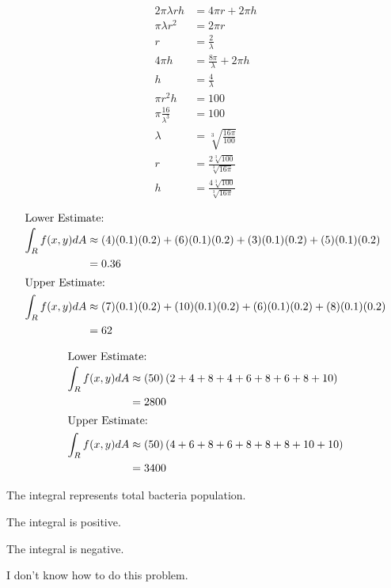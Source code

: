 \documentclass[10pt]{extarticle}
\begin{document}
\begin{problem}{15.3}
\begin{description}[font=\normalfont]
\begin{align*}
          2\pi\lambda r h &= 4\pi r + 2\pi h\\
          \pi\lambda r^2 &= 2\pi r\\
          r &= \frac{2}{\lambda}\\
          4\pi h &= \frac{8\pi}{\lambda} + 2\pi h\\
          h &= \frac{4}{\lambda}\\
          \pi r^2 h &= 100\\
          \pi \frac{16}{\lambda^3} &= 100\\
          \lambda &= \sqrt[3]{\frac{16\pi}{100}}\\
          r &= \frac{2\sqrt[3]{100}}{\sqrt[3]{16\pi}}\\
          h &= \frac{4\sqrt[3]{100}}{\sqrt[3]{16\pi}}
        \end{align*}
    \end{description}
  \end{problem}
  \begin{problem}{16.1}
    \begin{description}[font=\normalfont]
      \item[2:]
        \begin{align*}
          \shortintertext{Lower Estimate:}
          \int_{R}f(x,y) dA &\approx (4)(0.1)(0.2) + (6)(0.1)(0.2) + (3)(0.1)(0.2) + (5)(0.1)(0.2)\\
                            &= 0.36\\
          \shortintertext{Upper Estimate:}
          \int_{R}f(x,y) dA &\approx (7)(0.1)(0.2) + (10)(0.1)(0.2) + (6)(0.1)(0.2) + (8)(0.1)(0.2)\\
                            &= 62
        \end{align*}
      \item[4:]
        \begin{align*}
          \shortintertext{Lower Estimate:}
          \int_{R}f(x,y) dA &\approx (50)\left(2+4+8+4+6+8+6+8+10\right)\\
                            &= 2800\\
          \shortintertext{Upper Estimate:}
          \int_{R}f(x,y) dA &\approx (50)\left(4+6+8+6+8+8+8+10+10\right)\\
                            &= 3400
        \end{align*}
      \item[6:] The integral represents total bacteria population.
      \item[8:] The integral is positive.
      \item[14:] The integral is negative.
      \item[20:] I don't know how to do this problem.
    \end{description}
  \end{problem}
\end{document}
